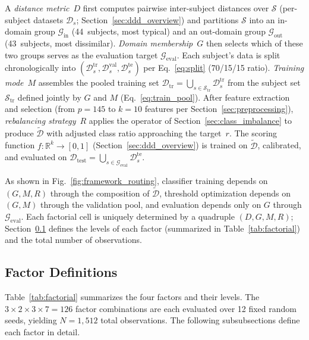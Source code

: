 \documentclass[lettersize,journal]{IEEEtran}
\begin{document}
A \emph{distance metric}~$D$ first computes pairwise inter-subject distances over $\mathcal{S}$ (per-subject datasets $\mathcal{D}_s$; Section~\ref{sec:ddd_overview}) and partitions $\mathcal{S}$ into an in-domain group $\mathcal{G}_{\mathrm{in}}$ (44~subjects, most typical) and an out-domain group $\mathcal{G}_{\mathrm{out}}$ (43~subjects, most dissimilar).
\emph{Domain membership}~$G$ then selects which of these two groups serves as the evaluation target $\mathcal{G}_{\mathrm{eval}}$.
Each subject's data is split chronologically into $(\mathcal{D}_s^{\mathrm{tr}}, \mathcal{D}_s^{\mathrm{val}}, \mathcal{D}_s^{\mathrm{te}})$ per Eq.~\eqref{eq:split} (70/15/15 ratio).
\emph{Training mode}~$M$ assembles the pooled training set $\mathcal{D}_{\mathrm{tr}} = \bigcup_{s \in \mathcal{S}_{\mathrm{tr}}} \mathcal{D}_s^{\mathrm{tr}}$ from the subject set $\mathcal{S}_{\mathrm{tr}}$ defined jointly by $G$ and $M$ (Eq.~\eqref{eq:train_pool}).
After feature extraction and selection (from $p = 145$ to $k = 10$ features per Section~\ref{sec:preprocessing}), \emph{rebalancing strategy}~$R$ applies the operator of Section~\ref{sec:class_imbalance} to produce $\tilde{\mathcal{D}}$ with adjusted class ratio approaching the target~$r$.
The scoring function $f\colon \mathbb{R}^k \to [0,1]$ (Section~\ref{sec:ddd_overview}) is trained on $\tilde{\mathcal{D}}$, calibrated, and evaluated on $\mathcal{D}_{\mathrm{test}} = \bigcup_{s \in \mathcal{G}_{\mathrm{eval}}} \mathcal{D}_s^{\mathrm{te}}$.

As shown in Fig.~\ref{fig:framework_routing}, classifier training depends on $(G, M, R)$ through the composition of $\tilde{\mathcal{D}}$, threshold optimization depends on $(G, M)$ through the validation pool, and evaluation depends only on $G$ through $\mathcal{G}_{\mathrm{eval}}$.
Each factorial cell is uniquely determined by a quadruple $(D, G, M, R)$; Section~\ref{sec:factor_defs} defines the levels of each factor (summarized in Table~\ref{tab:factorial}) and the total number of observations.

\subsection{Factor Definitions}\label{sec:factor_defs}
Table~\ref{tab:factorial} summarizes the four factors and their levels.
The $3 \times 2 \times 3 \times 7 = 126$ factor combinations are each evaluated over 12 fixed random seeds, yielding $N = 1{,}512$ total observations.
The following subsubsections define each factor in detail.
\end{document}
